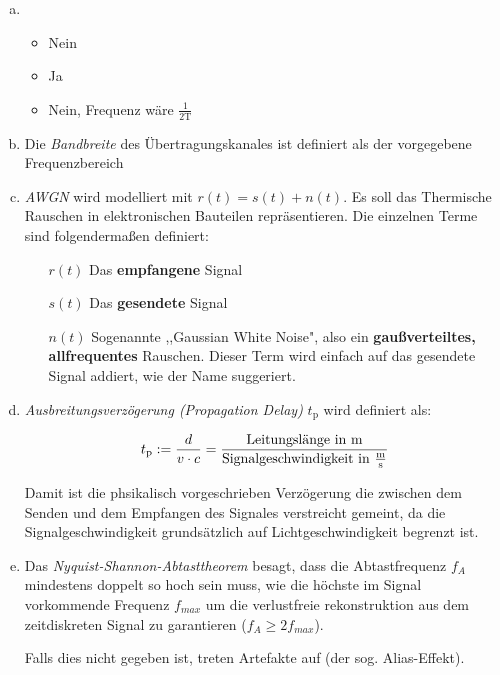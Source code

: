 \begin{enumerate}[a)]

	\item 
	
	\begin{itemize}
	
		\item Nein
		\item Ja
		\item Nein, Frequenz wäre $\frac{1}{2\text{T}}$
	
	\end{itemize}

	\item Die \emph{Bandbreite} des Übertragungskanales ist definiert als der vorgegebene Frequenzbereich
	
	\item \emph{AWGN} wird modelliert mit $r(t) = s(t) + n(t)$. Es soll das Thermische Rauschen in elektronischen Bauteilen repräsentieren. Die einzelnen Terme sind folgendermaßen definiert:
	
	\begin{itemize}
	
		\item[$r(t)$] Das \textbf{empfangene} Signal
		\item[$s(t)$] Das \textbf{gesendete} Signal
		\item[$n(t)$] Sogenannte ,,Gaussian White Noise", also ein \textbf{gaußverteiltes, allfrequentes} Rauschen. Dieser Term wird einfach auf das gesendete Signal addiert, wie der Name suggeriert.
		
		
	\end{itemize}		
	
	
	\item \emph{Ausbreitungsverzögerung (Propagation Delay)} $t_{\text{p}}$ wird definiert als:
	
		$$ 
			t_{\text{p}} := \frac{d}{v \cdot c} = 
			\frac{\text{Leitungslänge in m}}{\text{Signalgeschwindigkeit in $\frac{\text{m}}{\text{s}}$}} 
		$$
		
		Damit ist die phsikalisch vorgeschrieben Verzögerung die zwischen dem Senden und dem Empfangen des Signales verstreicht gemeint, da die Signalgeschwindigkeit grundsätzlich auf Lichtgeschwindigkeit begrenzt ist.
	
	\item Das \emph{Nyquist-Shannon-Abtasttheorem} besagt, dass die Abtastfrequenz $f_A$ mindestens doppelt so hoch sein muss, wie die höchste im Signal vorkommende Frequenz $f_{max}$ um die verlustfreie rekonstruktion aus dem zeitdiskreten Signal zu garantieren ($f_A \geq 2f_{max}$).
	
	\bigskip
	
	Falls dies nicht gegeben ist, treten Artefakte auf (der sog. Alias-Effekt).
	
\end{enumerate}


\vfill


